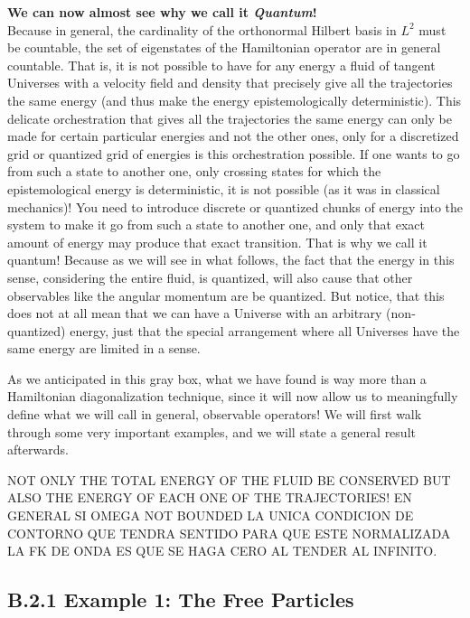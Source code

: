 \documentclass[11pt, a4paper]{article} %
\DeclareRobustCommand{\mybox}[2][gray!10]{%
\begin{tcolorbox}[   %
        left=0.2cm,
        right=0.2cm,
        top=0.15cm,
        bottom=0.15cm,
        colback=#1,
        colframe=#1,
        width=\dimexpr\textwidth\relax, 
        enlarge left by=0mm,
        boxsep=5pt,
        arc=0pt,outer arc=0pt,
        ]
        #2
\end{tcolorbox}
}
\begin{document}
\mybox{
{\bf We can now almost see why we call it {\em Quantum}!\\ }
Because in general, the cardinality of the orthonormal Hilbert basis in $L^2$ must be countable, the set of eigenstates of the Hamiltonian operator are in general countable. That is, it is not possible to have for any energy a fluid of tangent Universes with a velocity field and density that precisely give all the trajectories the same energy (and thus make the energy epistemologically deterministic). This delicate orchestration that gives all the trajectories the same energy can only be made for certain particular energies and not the other ones, only for a discretized grid or quantized grid of energies is this orchestration possible. If one wants to go from such a state to another one, only crossing states for which the epistemological energy is deterministic, it is not possible (as it was in classical mechanics)! You need to introduce discrete or quantized chunks of energy into the system to make it go from such a state to another one, and only that exact amount of energy may produce that exact transition. That is why we call it quantum! Because as we will see in what follows, the fact that the energy in this sense, considering the entire fluid, is quantized, will also cause that other observables like the angular momentum are be quantized. But notice, that this does not at all mean that we can have a Universe with an arbitrary (non-quantized) energy, just that the special arrangement where all Universes have the same energy are limited in a sense.
}



As we anticipated in this gray box, what we have found is way more than a Hamiltonian diagonalization technique, since it will now allow us to meaningfully define what we will call in general, observable operators! We will first walk through some very important examples, and we will state a general result afterwards.

NOT ONLY THE TOTAL ENERGY OF THE FLUID BE CONSERVED BUT ALSO THE ENERGY OF EACH ONE OF THE TRAJECTORIES!
EN GENERAL SI OMEGA NOT BOUNDED LA UNICA CONDICION DE CONTORNO QUE TENDRA SENTIDO PARA QUE ESTE NORMALIZADA LA FK DE ONDA ES QUE SE HAGA CERO AL TENDER AL INFINITO.



\subsection*{B.2.1 Example 1: The Free Particles}
\end{document}
